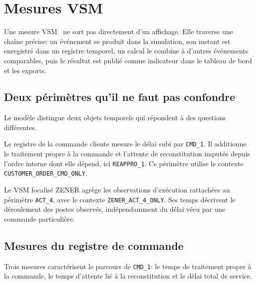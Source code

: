 \chapter{Mesures VSM}
\label{chap:mesures-vsm}

Une mesure VSM~\cite{rothershook2003} ne sort pas directement d'un affichage. Elle traverse une chaîne précise: un événement se produit dans la simulation, son instant est enregistré dans un registre temporel, un calcul le combine à d'autres événements comparables, puis le résultat est publié comme indicateur dans le tableau de bord et les exports.

\section{Deux périmètres qu'il ne faut pas confondre}

Le modèle distingue deux objets temporels qui répondent à des questions différentes.

Le registre de la commande cliente mesure le délai subi par \texttt{CMD\_1}. Il additionne le traitement propre à la commande et l'attente de reconstitution imputée depuis l'ordre interne dont elle dépend, ici \texttt{REAPPRO\_1}. Ce périmètre utilise le contexte \texttt{CUSTOMER\_ORDER\_CMD\_ONLY}.

Le VSM focalisé ZENER agrège les observations d'exécution rattachées au périmètre \texttt{ACT\_4}, avec le contexte \texttt{ZENER\_ACT\_4\_ONLY}. Ses temps décrivent le déroulement des postes observés, indépendamment du délai vécu par une commande particulière.


\section{Mesures du registre de commande}

Trois mesures caractérisent le parcours de \texttt{CMD\_1}: le temps de traitement propre à la commande, le temps d'attente lié à la reconstitution et le délai total de service.

